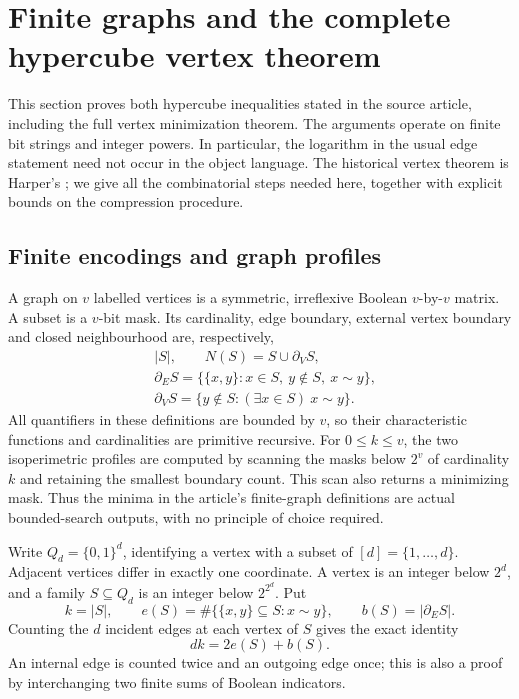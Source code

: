 \section{Finite graphs and the complete hypercube vertex theorem}
\label{sec:hypercube}

This section proves both hypercube inequalities stated in the source article,
including the full vertex minimization theorem.  The arguments operate on
finite bit strings and integer powers.  In particular, the logarithm in the
usual edge statement need not occur in the object language.  The historical
vertex theorem is Harper's \cite{Harper1966,Harper2004}; we give all the
combinatorial steps needed here, together with explicit bounds on the
compression procedure.

\subsection{Finite encodings and graph profiles}

A graph on \(v\) labelled vertices is a symmetric, irreflexive Boolean
\(v\)-by-\(v\) matrix.  A subset is a \(v\)-bit mask.  Its cardinality,
edge boundary, external vertex boundary and closed neighbourhood are,
respectively,
\[
 \begin{aligned}
 &|S|,\qquad N(S)=S\cup\partial_V S,\\
 &\partial_E S=\{\{x,y\}:x\in S,\ y\notin S,\ x\sim y\},\\
 &\partial_V S=\{y\notin S:(\exists x\in S)\ x\sim y\}.
 \end{aligned}
\]
All quantifiers in these definitions are bounded by \(v\), so their
characteristic functions and cardinalities are primitive recursive.
For \(0\leq k\leq v\), the two isoperimetric profiles are computed by
scanning the masks below \(2^v\) of cardinality \(k\) and retaining the
smallest boundary count.  This scan also returns a minimizing mask.
Thus the minima in the article's finite-graph definitions are actual
bounded-search outputs, with no principle of choice required.

Write \(Q_d=\{0,1\}^d\), identifying a vertex with a subset of
\([d]=\{1,\ldots,d\}\).  Adjacent vertices differ in exactly one coordinate.
A vertex is an integer below \(2^d\), and a family \(S\subseteq Q_d\) is
an integer below \(2^{2^d}\).  Put
\[
 k=|S|,\qquad e(S)=\#\{\{x,y\}\subseteq S:x\sim y\},
 \qquad b(S)=|\partial_E S|.
\]
Counting the \(d\) incident edges at each vertex of \(S\) gives the exact
identity
\begin{equation}\label{eq:cube-degree}
 dk=2e(S)+b(S).
\end{equation}
An internal edge is counted twice and an outgoing edge once; this is also a
proof by interchanging two finite sums of Boolean indicators.

